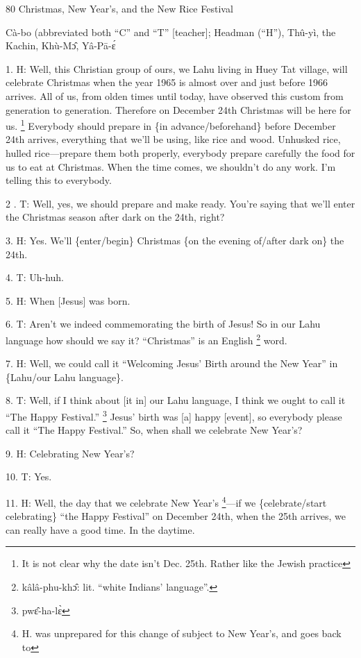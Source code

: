 
80 Christmas, New Year's, and the New Rice Festival

Cà-bo (abbreviated both ``C'' and ``T'' [teacher]; Headman (``H''), Thû-yì,
the Kachin, Khù-Mɔ̂, Yâ-Pā-ɛ́

1. H: Well, this Christian group of ours, we Lahu living in Huey Tat village, will
celebrate Christmas when the year 1965 is almost over and just before 1966 arrives.
All of us, from olden times until today, have observed this custom from generation
to generation.  Therefore on December 24th Christmas will be here for us. \footnote{It is not clear why the date isn't Dec. 25th.  Rather like the Jewish practice} Everybody
should prepare in \{in advance/beforehand\} before December 24th arrives, everything
that we'll be using, like rice and wood.  Unhusked rice, hulled rice---prepare
them both properly, everybody prepare carefully the food for us to eat at Christmas.
When the time comes, we shouldn't do any work.  I'm telling this to everybody.

2 . T: Well, yes, we should prepare and make ready.  You're saying that we'll enter
the Christmas season after dark on the 24th, right?

3. H: Yes.  We'll \{enter/begin\} Christmas \{on the evening of/after dark on\}
the 24th.

4. T: Uh-huh.

5. H: When [Jesus] was born.

6. T: Aren't we indeed commemorating the birth of Jesus!  So in our Lahu language
how should we say it?  ``Christmas'' is an English \footnote{kâlâ-phu-khɔ̂: lit. ``white Indians' language''.} word.

7. H: Well, we could call it ``Welcoming Jesus' Birth around the New Year'' in
\{Lahu/our Lahu language\}.

8. T: Well, if I think about [it in] our Lahu language, I think we ought to call
it ``The Happy Festival.'' \footnote{pwɛ̂-ha-lɛ̀}  Jesus' birth was [a] happy [event], so everybody
please call it ``The Happy Festival.''  So, when shall we celebrate New Year's?

9. H: Celebrating New Year's?

10. T: Yes.

11. H: Well, the day that we celebrate New Year's \footnote{H. was unprepared for this change of subject to New Year's, and goes back to}---if we \{celebrate/start
celebrating\} ``the Happy Festival'' on December 24th, when the 25th arrives, we
can really have a good time.  In the daytime.

